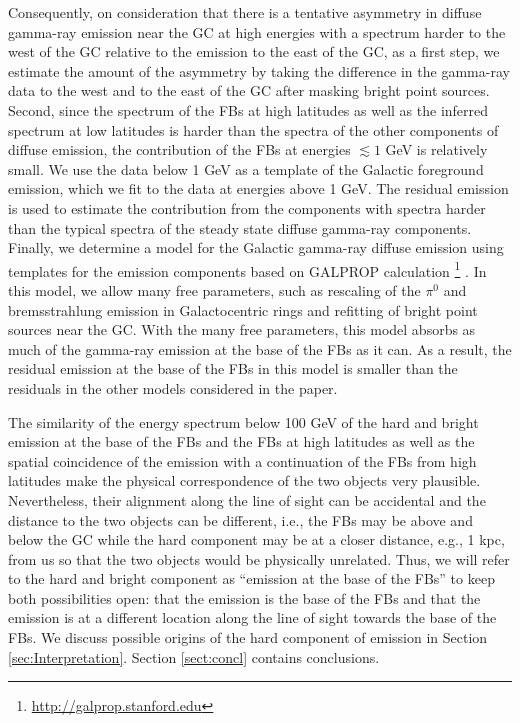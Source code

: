 Consequently, on consideration that there is a tentative asymmetry in diffuse gamma-ray emission near the GC at high energies with a spectrum
harder to the west of the GC relative to the emission to the east of the GC,
as a first step,
we estimate the amount of the asymmetry by taking the difference in the gamma-ray data to the west and to the east of the GC 
after masking bright point sources.
Second, since the spectrum of the FBs at high latitudes as well as the inferred spectrum at low latitudes
is harder than the spectra of the other components of diffuse emission,
the contribution of the FBs at energies $\lesssim 1$ GeV is relatively small. 
We use the data below 1 GeV as a template of the Galactic foreground emission, 
which we fit to the data at energies above 1 GeV.
The residual emission is used to estimate the contribution from the components with spectra harder than the typical 
spectra of the steady state diffuse gamma-ray components.
Finally, we determine a model for the Galactic gamma-ray diffuse emission using templates for the emission 
components based on GALPROP calculation%
\footnote{\url{http://galprop.stanford.edu}} 
\citep{Moskalenko:1997gh, Strong:1998fr, Strong:2004de, Ptuskin:2005ax, 2007ARNPS..57..285S, Porter:2008ve,Vladimirov:2010aq}. 
In this model, we allow many free parameters, such as rescaling of the $\pi^0$ and bremsstrahlung emission in Galactocentric rings and refitting of bright point sources near the GC.
With the many free parameters, this model absorbs as much of the gamma-ray emission at the base of the FBs as it can. As a result, the residual emission at the base of the FBs in this model is smaller than the residuals in the other models considered in the paper.

The similarity of the energy spectrum below 100 GeV of the hard and bright emission at the base of the FBs 
and the FBs at high latitudes as well as the spatial coincidence of the emission with a continuation of the FBs from high latitudes 
make the physical correspondence of the two objects very plausible.
Nevertheless, their alignment along the line of sight can be accidental and the distance to the two objects can be different, i.e., the FBs may be
above and below the GC while the hard component may be at a closer distance, e.g., 1 kpc, from us so that the two objects would be physically unrelated.
Thus, we will refer to the hard and bright component as ``emission at the base of the FBs'' to keep both possibilities open: 
that the emission is the base of the FBs and that the emission is at a different location along the line of sight towards the base of the FBs.
We discuss possible origins of the hard component of emission in Section \ref{sec:Interpretation}.
Section \ref{sect:concl} contains conclusions.
